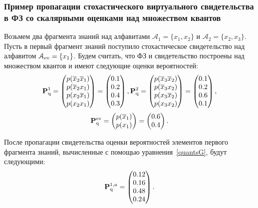 \subsubsection{Пример пропагации стохастического виртуального свидетельства в ФЗ со скалярными оценками над множеством квантов}
Возьмем два фрагмента знаний над алфавитами $\mathcal{A}_1 = \{x_1, x_2\}$ и  $\mathcal{A}_2 = \{x_2, x_3\}$. Пусть в первый фрагмент знаний поступило стохастическое свидетельство над алфавитом $\mathcal{A}_{\mathrm{ev}} = \{x_1\}$. Будем считать, что ФЗ и свидетельство построены над множеством квантов и имеют следующие оценки вероятностей: 
\begin{equation*}
\mathbf{P}_\mathrm{q}^1 =  \begin{pmatrix}
p(\overline{x}_2\overline{x}_1)\\ p(\overline{x}_2x_1) \\ p(x_2\overline{x}_1) \\ p(x_2x_1)
\end{pmatrix} = \begin{pmatrix}
0.1\\ 0.2\\ 0.4\\ 0.3
\end{pmatrix},
\mathbf{P}_\mathrm{q}^2 =  \begin{pmatrix}
p(\overline{x}_3\overline{x}_2)\\ p(\overline{x}_3x_2)\\ p(x_3\overline{x}_2) \\ p(x_3x_2)
\end{pmatrix} = \begin{pmatrix}
0.1 \\ 0.2\\ 0.6\\ 0.1 
\end{pmatrix},
\end{equation*}
\begin{equation*}
\mathbf{P}_\mathrm{q}^{\mathrm{ev}} = \begin{pmatrix}   p(\overline{x}_1) \\ p(x_1)	\end{pmatrix} = \begin{pmatrix}
0.6 \\ 0.4
\end{pmatrix}.
\end{equation*}

После пропагации свидетельства оценки вероятностей элементов первого фрагмента знаний, вычисленные с помощью уравнения~\ref{quantsG}, будут следующими:
\begin{equation*}
\mathbf{P}_\mathrm{q}^{1,a} = \begin{pmatrix}
0.12 \\  0.16 \\ 0.48\\ 0.24
\end{pmatrix}.
\end{equation*}

